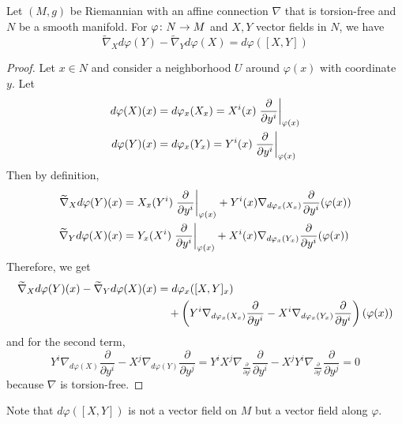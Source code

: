 \begin{enumerate}[label=\arabic{*}.]
	\begin{prop}
		Let $(M,g)$ be Riemannian with an affine connection $\nabla$ that is torsion-free and $N$ be a smooth manifold. For $\varphi \colon N \rightarrow M$ and $X,Y$ vector fields in $N$, we have
		\begin{equation*}
			\widetilde{\nabla}_X d\varphi(Y) - \widetilde{\nabla}_Yd\varphi(X) = d\varphi([X,Y])
		\end{equation*}
	\end{prop}
	\begin{proof}
		Let $x \in N$ and consider a neighborhood $U$ around $\varphi(x)$ with coordinate $y$. Let
		\begin{equation*}
			\begin{aligned}
				d\varphi(X)(x) &= d\varphi_x(X_x) = X^i(x)\left.\frac{\partial}{\partial y^i}\right\lvert_{\varphi(x)} \\
				d\varphi(Y)(x) &= d\varphi_x(Y_x) = Y^i(x)\left.\frac{\partial}{\partial y^i}\right\lvert_{\varphi(x)}
			\end{aligned}
		\end{equation*}
		Then by definition,
		\begin{equation*}
			\begin{aligned}
				\widetilde{\nabla}_{X}d\varphi(Y)(x) &= X_x(Y^i)\left.\frac{\partial}{\partial y^i}\right\lvert_{\varphi(x)}+Y^i(x)\nabla_{d\varphi_x(X_x)}\frac{\partial}{\partial y^i}(\varphi(x)) \\
				\widetilde{\nabla}_{Y}d\varphi(X)(x) &=Y_x(X^i)\left.\frac{\partial}{\partial y^i}\right\lvert_{\varphi(x)}+X^i(x)\nabla_{d\varphi_x(Y_x)}\frac{\partial}{\partial y^i}(\varphi(x))
			\end{aligned}
		\end{equation*}
		Therefore, we get
		\begin{equation*}
			\begin{aligned}
				\widetilde{\nabla}_{X}d\varphi(Y)(x) - \widetilde{\nabla}_{Y}d\varphi(X)(x) &= d\varphi_x([X,Y]_x) \\
				&\quad+ \left(Y^i\nabla_{d\varphi_x(X_x)}\frac{\partial}{\partial y^i} - X^i\nabla_{d\varphi_x(Y_x)}\frac{\partial}{\partial y^i}\right)(\varphi(x))
			\end{aligned}
		\end{equation*}
		and for the second term,
		\begin{equation*}
			Y^i\nabla_{d\varphi(X)}\frac{\partial}{\partial y^i} - X^j\nabla_{d\varphi(Y)}\frac{\partial}{\partial y^j} = Y^iX^j\nabla_{\frac{\partial}{\partial y^j}}\frac{\partial}{\partial y^i} - X^jY^i\nabla_{\frac{\partial}{\partial y^i}}\frac{\partial}{\partial y^j} = 0
		\end{equation*}
		because $\nabla$ is torsion-free.
	\end{proof}
	\noindent Note that $d\varphi([X,Y])$ is not a vector field on $M$ but a vector field along $\varphi$.


\end{enumerate}
